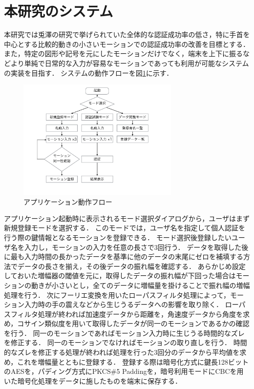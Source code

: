 \section{本研究のシステム}
本研究では兎澤の研究で挙げられていた全体的な認証成功率の低さ，特に手首を中心とする比較的動きの小さいモーションでの認証成功率の改善を目標とする．
また，特定の図形や記号を元にしたモーションだけでなく，端末を上下に振るなどより単純で日常的な入力が容易なモーションであっても利用が可能なシステムの実装を目指す．
システムの動作フローを図\ref{flow}に示す．

\begin{figure}[bthp]
    \centering
    \includegraphics[bb=0 100 950 750, width=80mm]{flow.pdf}
    \caption{アプリケーション動作フロー}
    \label{flow}
\end{figure}

アプリケーション起動時に表示されるモード選択ダイアログから，ユーザはまず新規登録モードを選択する．
このモードでは，ユーザ名を指定して個人認証を行う際の鍵情報となるモーションを登録できる．
モード選択後登録したいユーザ名を入力し，モーションの入力を任意の長さで3回行う．
データを取得した後に最も入力時間の長かったデータを基準に他のデータの末尾にゼロを補填する方法でデータの長さを揃え，その後データの振れ幅を確認する．
あらかじめ設定しておいた増幅器の閾値を元に，取得したデータの振れ幅が下回った場合はモーションの動きが小さいとし，全てのデータに増幅量を掛けることで振れ幅の増幅処理を行う．
次にフーリエ変換を用いたローパスフィルタ処理によって，モーション入力時の手の震えなどから生じうるデータへの影響を取り除く．
ローパスフィルタ処理が終われば加速度データから距離を，角速度データから角度を求め，コサイン類似度を用いて取得したデータが同一のモーションであるかの確認を行う．
同一のモーションであればモーション入力時に生じうる時間的なズレを修正する．
同一のモーションでなければモーションの取り直しを行う．
時間的なズレを修正する処理が終われば処理を行った3回分のデータから平均値を求め，これを増幅量とともに登録する．
登録する際は暗号化方式に鍵長128ビットのAESを，パディング方式にPKCS\#5 Paddingを，暗号利用モードにCBCを用いた暗号化処理をデータに施したものを端末に保存する．

